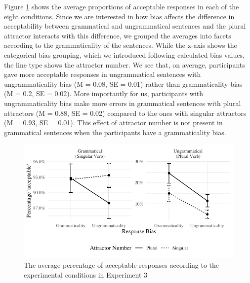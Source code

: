 Figure \ref{fig:AvgResponse} shows the average proportions of acceptable responses in each of the eight conditions. Since we are interested in how bias affects the difference in acceptability between grammatical and ungrammatical sentences and the plural attractor interacts with this difference, we grouped the averages into facets according to the grammaticality of the sentences. While the x-axis shows the categorical bias grouping, which we introduced following calculated bias values, the line type shows the attractor number. We see that, on average, participants gave more acceptable responses in ungrammatical sentences with ungrammaticality bias (M = 0.08, SE = 0.01) rather than grammaticality bias (M = 0.2, SE = 0.02). More importantly for us, participants with ungrammaticality bias make more errors in grammatical sentences with plural attractors (M = 0.88, SE = 0.02) compared to the ones with singular attractors (M = 0.93, SE = 0.01). This effect of attractor number is not present in grammatical sentences when the participants have a grammaticality bias.


\begin{knitrout}
\color{fgcolor}\begin{figure}[hbt!]

{\centering \includegraphics[width=\linewidth]{figure/AvgResponse-1} 

}

\caption{The average percentage of acceptable responses according to the experimental conditions in Experiment 3}\label{fig:AvgResponse}
\end{figure}

\end{knitrout}

